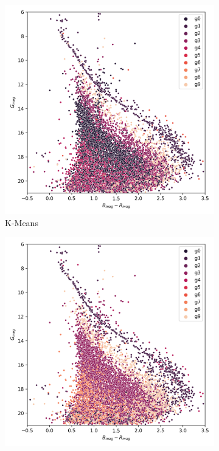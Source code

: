 \documentclass[11pt,a4paper,english,twocolumn]{article}
\begin{document}
\begin{figure}[!hbt]
  \begin{subfigure}{0.3\textwidth}
    \includegraphics[width=\textwidth]{../figures/ngc_2632/kmeans_hr_diagram_ngc_2632.png}
    \caption{K-Means}
  \end{subfigure}
  \begin{subfigure}{0.3\textwidth}
    \includegraphics[width=\textwidth]{../figures/ngc_2632/dec_hr_diagram_ngc_2632.png}

\end{subfigure}
\end{figure}
\end{document}
